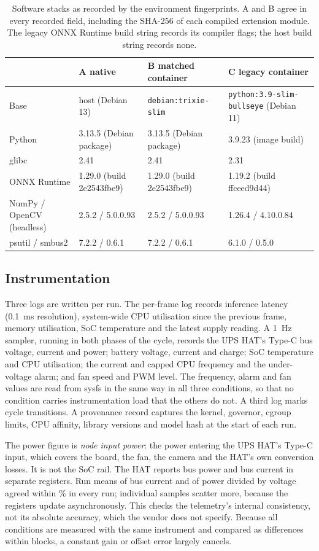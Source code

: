 \documentclass[10pt,journal,compsoc]{IEEEtran}
\begin{document}
\begin{table}[t]
\centering
\caption{Software stacks as recorded by the environment fingerprints. A and B agree in every recorded field, including the SHA-256 of each compiled extension module. The legacy ONNX Runtime build string records its compiler flags; the host build string records none.}
\label{tab:stacks}
\footnotesize
\begin{tabular}{llll}
\toprule
 & A native & B matched container & C legacy container \\
\midrule
Base & host (Debian 13) & \texttt{debian:trixie-slim} & \texttt{python:3.9-slim-bullseye} (Debian 11)\\
Python & 3.13.5 (Debian package) & 3.13.5 (Debian package) & 3.9.23 (image build) \\
glibc & 2.41 & 2.41 & 2.31 \\
ONNX Runtime & 1.29.0 (build 2e2543fbe9) & 1.29.0 (build 2e2543fbe9) & 1.19.2 (build ffceed9d44)\\
NumPy / OpenCV (headless) & 2.5.2 / 5.0.0.93 & 2.5.2 / 5.0.0.93 & 1.26.4 / 4.10.0.84 \\
psutil / smbus2 & 7.2.2 / 0.6.1 & 7.2.2 / 0.6.1 & 6.1.0 / 0.5.0 \\
\bottomrule
\end{tabular}
\end{table}

\subsection{Instrumentation}
Three logs are written per run. The per-frame log records inference latency (0.1~ms resolution), system-wide CPU utilisation since the previous frame, memory utilisation, SoC temperature and the latest supply reading. A 1~Hz sampler, running in both phases of the cycle, records the UPS HAT's Type-C bus voltage, current and power; battery voltage, current and charge; SoC temperature and CPU utilisation; the current and capped CPU frequency and the under-voltage alarm; and fan speed and PWM level. The frequency, alarm and fan values are read from sysfs in the same way in all three conditions, so that no condition carries instrumentation load that the others do not. A third log marks cycle transitions. A provenance record captures the kernel, governor, cgroup limits, CPU affinity, library versions and model hash at the start of each run.

The power figure is \emph{node input power}: the power entering the UPS HAT's Type-C input, which covers the board, the fan, the camera and the HAT's own conversion losses. It is not the SoC rail. The HAT reports bus power and bus current in separate registers. Run means of bus current and of power divided by voltage agreed within \PVIDev\% in every run; individual samples scatter more, because the registers update asynchronously. This checks the telemetry's internal consistency, not its absolute accuracy, which the vendor does not specify. Because all conditions are measured with the same instrument and compared as differences within blocks, a constant gain or offset error largely cancels.
\end{document}
